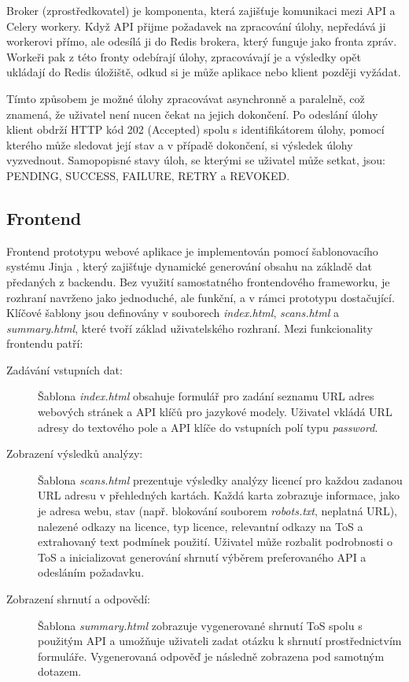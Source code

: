 Broker (zprostředkovatel) je komponenta, která zajišťuje komunikaci mezi API a Celery workery.
Když API přijme požadavek na zpracování úlohy, nepředává ji workerovi přímo, ale odesílá ji do Redis brokera, který funguje jako fronta zpráv.
Workeři pak z této fronty odebírají úlohy, zpracovávají je a výsledky opět ukládají do Redis úložiště, odkud si je může aplikace nebo klient později vyžádat.

Tímto způsobem je možné úlohy zpracovávat asynchronně a paralelně, což znamená, že uživatel není nucen čekat na jejich dokončení.
Po odeslání úlohy klient obdrží HTTP kód 202 (Accepted) spolu s identifikátorem úlohy, pomocí kterého může sledovat její stav a v případě dokončení, si výsledek úlohy vyzvednout.
Samopopisné stavy úloh, se kterými se uživatel může setkat, jsou: PENDING, SUCCESS, FAILURE, RETRY a REVOKED.

\subsection{Frontend}

Frontend prototypu webové aplikace je implementován pomocí šablonovacího systému Jinja \cite{palletsprojectsJinjax2014}, který zajišťuje dynamické generování obsahu na základě dat předaných z backendu.
Bez využití samostatného frontendového frameworku, je rozhraní navrženo jako jednoduché, ale funkční, a v rámci prototypu dostačující.
Klíčové šablony jsou definovány v souborech \textit{index.html}, \textit{scans.html} a \textit{summary.html}, které tvoří základ uživatelského rozhraní.
Mezi funkcionality frontendu patří:
\begin{description}
    \item[Zadávání vstupních dat:] Šablona \textit{index.html} obsahuje formulář pro zadání seznamu URL adres webových stránek a API klíčů pro jazykové modely. Uživatel vkládá URL adresy do textového pole a API klíče do vstupních polí typu \textit{password}.
    
    \item[Zobrazení výsledků analýzy:] Šablona \textit{scans.html} prezentuje výsledky analýzy licencí pro každou zadanou URL adresu v přehledných kartách. Každá karta zobrazuje informace, jako je adresa webu, stav (např. blokování souborem \textit{robots.txt}, neplatná URL), nalezené odkazy na licence, typ licence, relevantní odkazy na ToS a extrahovaný text podmínek použití. Uživatel může rozbalit podrobnosti o ToS a inicializovat generování shrnutí výběrem preferovaného API a odesláním požadavku.
    
    \item[Zobrazení shrnutí a odpovědí:] Šablona \textit{summary.html} zobrazuje vygenerované shrnutí ToS spolu s použitým API a umožňuje uživateli zadat otázku k shrnutí prostřednictvím formuláře. Vygenerovaná odpověď je následně zobrazena pod samotným dotazem.
  \end{description}
  

